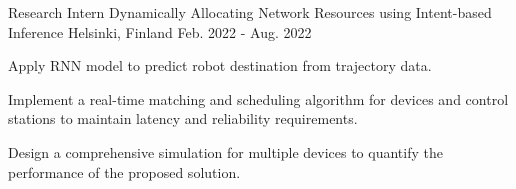 

\begin{cventries}
    \cventry
    {Research Intern} %
    {Dynamically Allocating Network Resources using Intent-based Inference} %
    {Helsinki, Finland} %
    {Feb. 2022 - Aug. 2022} %
    {
      \begin{cvitems} %
        \item {Apply RNN model to predict robot destination from trajectory data.}
        \item {Implement a real-time matching and scheduling algorithm for devices and control stations to maintain latency and reliability requirements.}
        \item {Design a comprehensive simulation for multiple devices to quantify the performance of the proposed solution.}
      \end{cvitems}
    }





\end{cventries}
